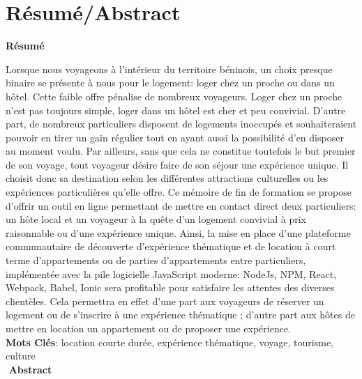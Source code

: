 \chapter{Résumé/Abstract}
\begin{flushleft}\textbf{Résumé}\end{flushleft}
Lorsque nous voyageons à l'intérieur du territoire béninois, un choix presque binaire se présente à nous pour le logement: loger chez un proche ou dans un hôtel. Cette faible offre pénalise de nombreux voyageurs. Loger chez un proche n'est pas toujours simple, loger dans un hôtel est cher et peu convivial. D'autre part, de nombreux particuliers disposent de logements inoccupés et souhaiteraient pouvoir en tirer un gain régulier tout en ayant aussi la possibilité d’en disposer au moment voulu. Par ailleurs, sans que cela ne constitue toutefois le but premier de son voyage, tout voyageur désire faire de son séjour une expérience unique. Il choisit donc sa destination selon les différentes attractions culturelles ou les expériences particulières qu’elle offre. Ce mémoire de fin de formation se propose d’offrir un outil en ligne permettant de mettre en contact direct deux particuliers: un hôte local et un voyageur à la quête d'un logement convivial à prix raisonnable ou d'une expérience unique. Ainsi, la mise en place d’une plateforme communautaire de découverte d'expérience thématique et de location à court terme d’appartements ou de parties d’appartements entre particuliers, implémentée avec la pile logicielle JavaScript moderne: NodeJs, NPM, React, Webpack, Babel, Ionic sera profitable  pour satisfaire les attentes des diverses clientèles. Cela permettra en effet d'une part aux voyageurs de réserver un logement ou de s’inscrire à une expérience thématique ; d'autre part aux hôtes de mettre en location un appartement ou de proposer une expérience. 
\\$ $\\ \textbf{Mots Clés}: location courte durée, expérience thématique, voyage, tourisme, culture
\newpage
$ $\\$ $\\$ $\\$ $\\$ $\\$ $\\$ $\\$ $\\$ $\\$ $\\$ $\\$ $
\textbf{Abstract}
